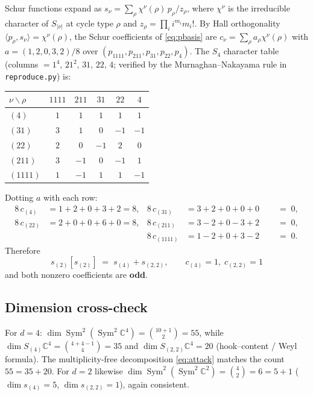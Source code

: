 \documentclass[11pt]{article}
\newcommand{\Sym}{\operatorname{Sym}}
\newcommand{\s}[1]{s_{#1}}
\theoremstyle{plain}
\begin{document}
Schur functions expand as $\s\nu = \sum_{\rho} \chi^{\nu}(\rho)\, p_\rho /
z_\rho$, where $\chi^\nu$ is the irreducible character of $S_{|\nu|}$ at
cycle type $\rho$ and $z_\rho = \prod_i i^{m_i} m_i!$.  By Hall orthogonality
$\langle p_\rho, \s\nu\rangle = \chi^\nu(\rho)$, the Schur coefficients of
\eqref{eq:pbasis} are $c_\nu = \sum_\rho a_\rho \chi^\nu(\rho)$ with
$a = (1,2,0,3,2)/8$ over $(p_{1111},p_{211},p_{31},p_{22},p_4)$.  The $S_4$
character table (columns $= 1^4,\, 21^2,\, 31,\, 22,\, 4$; verified by the
Murnaghan--Nakayama rule in \texttt{reproduce.py}) is:

\begin{center}
\begin{tabular}{lccccc}
\toprule
$\nu \backslash \rho$ & $1111$ & $211$ & $31$ & $22$ & $4$\\
\midrule
$(4)$      & $1$ & $1$ & $1$  & $1$  & $1$\\
$(31)$     & $3$ & $1$ & $0$  & $-1$ & $-1$\\
$(22)$     & $2$ & $0$ & $-1$ & $2$  & $0$\\
$(211)$    & $3$ & $-1$& $0$  & $-1$ & $1$\\
$(1111)$   & $1$ & $-1$& $1$  & $1$  & $-1$\\
\bottomrule
\end{tabular}
\end{center}

Dotting $a$ with each row:
\[
\begin{aligned}
8\,c_{(4)} &= 1+2+0+3+2 = 8, &
8\,c_{(31)} &= 3+2+0+0+0 \;\;&&=\; 0,\\
8\,c_{(22)} &= 2+0+0+6+0 = 8, &
8\,c_{(211)} &= 3-2+0-3+2 \;&&=\; 0,\\
&& 8\,c_{(1111)} &= 1-2+0+3-2 \;&&=\; 0.
\end{aligned}
\]
Therefore
\begin{equation}\label{eq:attack}
\boxed{\;\s{(2)}[\s{(2)}] \;=\; \s{(4)} + \s{(2,2)},\qquad
c_{(4)} = 1,\; c_{(2,2)} = 1\;}
\end{equation}
and both nonzero coefficients are \textbf{odd}.

\subsection{Dimension cross-check}\label{sec:dims}

For $d=4$: $\dim \Sym^2(\Sym^2 \mathbb{C}^4) = \binom{10+1}{2} = 55$, while
$\dim S_{(4)}\mathbb{C}^4 = \binom{4+4-1}{4} = 35$ and
$\dim S_{(2,2)}\mathbb{C}^4 = 20$ (hook--content / Weyl formula).  The
multiplicity-free decomposition \eqref{eq:attack} matches the count
$55 = 35 + 20$.  For $d=2$ likewise
$\dim \Sym^2(\Sym^2\mathbb{C}^2) = \binom{4}{2} = 6 = 5 + 1$
($\dim \s{(4)} = 5$, $\dim \s{(2,2)} = 1$), again consistent.
\end{document}
